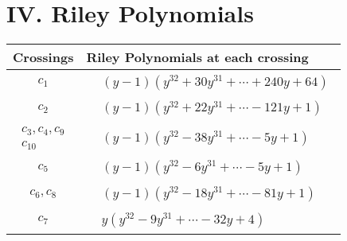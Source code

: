 \documentclass[1p]{elsarticle_modified}
\theoremstyle{definition}
\begin{document}
\centering \section*{ IV. Riley Polynomials}
\begin{tabular}{m{50pt}|m{274pt}}
Crossings & \hspace{64pt}Riley Polynomials at each crossing \\
\hline $$\begin{aligned}c_{1}\end{aligned}$$&$\begin{aligned}
&(y-1)(y^{32}+30 y^{31}+\cdots+240 y+64)
\end{aligned}$\\
\hline $$\begin{aligned}c_{2}\end{aligned}$$&$\begin{aligned}
&(y-1)(y^{32}+22 y^{31}+\cdots-121 y+1)
\end{aligned}$\\
\hline $$\begin{aligned}c_{3},c_{4},c_{9}\\c_{10}\end{aligned}$$&$\begin{aligned}
&(y-1)(y^{32}-38 y^{31}+\cdots-5 y+1)
\end{aligned}$\\
\hline $$\begin{aligned}c_{5}\end{aligned}$$&$\begin{aligned}
&(y-1)(y^{32}-6 y^{31}+\cdots-5 y+1)
\end{aligned}$\\
\hline $$\begin{aligned}c_{6},c_{8}\end{aligned}$$&$\begin{aligned}
&(y-1)(y^{32}-18 y^{31}+\cdots-81 y+1)
\end{aligned}$\\
\hline $$\begin{aligned}c_{7}\end{aligned}$$&$\begin{aligned}
&y(y^{32}-9 y^{31}+\cdots-32 y+4)
\end{aligned}$\\
\hline
\end{tabular}
\vskip 2pc
\end{document}
